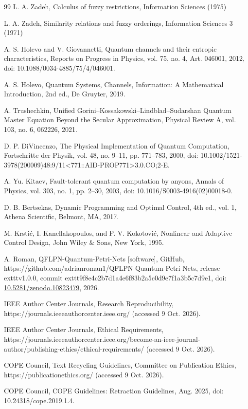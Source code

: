\documentclass[final,3p,times]{elsarticle}
\begin{document}
\begin{thebibliography}{99}
 L. A. Zadeh, Calculus of fuzzy restrictions, Information Sciences (1975)

 L. A. Zadeh, Similarity relations and fuzzy orderings, Information Sciences 3 (1971)

 A. S. Holevo and V. Giovannetti, Quantum channels and their entropic characteristics, Reports on Progress in Physics, vol. 75, no. 4, Art. 046001, 2012, doi: 10.1088/0034-4885/75/4/046001.

 A. S. Holevo, Quantum Systems, Channels, Information: A Mathematical Introduction, 2nd ed., De Gruyter, 2019.

 A. Trushechkin, Unified Gorini--Kossakowski--Lindblad--Sudarshan Quantum Master Equation Beyond the Secular Approximation, Physical Review A, vol. 103, no. 6, 062226, 2021.

 D. P. DiVincenzo, The Physical Implementation of Quantum Computation, Fortschritte der Physik, vol. 48, no. 9--11, pp. 771--783, 2000, doi: 10.1002/1521-3978(200009)48:9/11<771::AID-PROP771>3.0.CO;2-E.

 A. Yu. Kitaev, Fault-tolerant quantum computation by anyons, Annals of Physics, vol. 303, no. 1, pp. 2--30, 2003, doi: 10.1016/S0003-4916(02)00018-0.

 D. B. Bertsekas, Dynamic Programming and Optimal Control, 4th ed., vol. 1, Athena Scientific, Belmont, MA, 2017.

 M. Krsti\'{c}, I. Kanellakopoulos, and P. V. Kokotovi\'{c}, Nonlinear and Adaptive Control Design, John Wiley \& Sons, New York, 1995.

 A. Roman, QFLPN-Quantum-Petri-Nets [software], GitHub, https://github.com/adrianroman1/QFLPN-Quantum-Petri-Nets, release 	exttt{v1.0.0}, commit 	exttt{9f8e4c2b7d1a4e6f83b2a5c0d9e7f1a3b5c7d9e1}, doi: \href{https://doi.org/10.5281/zenodo.10823479}{10.5281/zenodo.10823479}, 2026.

 IEEE Author Center Journals, Research Reproducibility, https://journals.ieeeauthorcenter.ieee.org/ (accessed 9 Oct. 2026).

 IEEE Author Center Journals, Ethical Requirements, https://journals.ieeeauthorcenter.ieee.org/become-an-ieee-journal-author/publishing-ethics/ethical-requirements/ (accessed 9 Oct. 2026).

 COPE Council, Text Recycling Guidelines, Committee on Publication Ethics, https://publicationethics.org/ (accessed 9 Oct. 2026).

 COPE Council, COPE Guidelines: Retraction Guidelines, Aug. 2025, doi: 10.24318/cope.2019.1.4.

\end{thebibliography}
\end{document}
